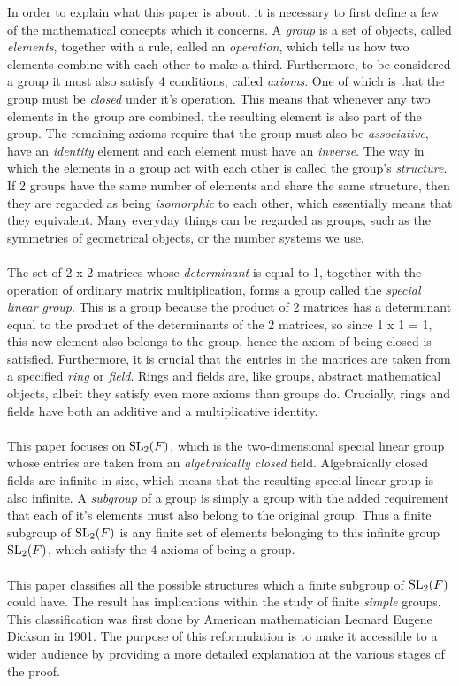 In order to explain what this paper is about, it is necessary to first define a few of the mathematical concepts which it concerns. A \textit{group} is a set of objects, called \textit{elements}, together with a rule, called an \textit{operation}, which tells us how two elements combine with each other to make a third. Furthermore, to be considered a group it must also satisfy 4 conditions, called \textit{axioms}. One of which is that the group must be \textit{closed} under it's operation. This means that whenever any two elements in the group are combined, the resulting element is also part of the group. The remaining axioms require that the group must also be \textit{associative}, have an \textit{identity} element and each element must have an \textit{inverse}. The way in which the elements in a group act with each other is called the group's \textit{structure}. If 2 groups have the same number of elements and share the same structure, then they are regarded as being \textit{isomorphic} to each other, which essentially means that they equivalent. Many everyday things can be regarded as groups, such as the symmetries of geometrical objects, or the number systems we use. \\
\\
The set of 2 x 2 matrices whose \textit{determinant} is equal to 1, together with the operation of ordinary matrix multiplication, 
forms a group called the \textit{special linear group}. This is a group because the product of 2 matrices has a determinant equal to the product of the determinants of the 2 matrices, 
so since 1 x 1 = 1, this new element also belongs to the group, hence the axiom of being closed is satisfied. 
Furthermore, it is crucial that the entries in the matrices are taken from a specified \textit{ring} or \textit{field}. 
Rings and fields are, like groups, abstract mathematical objects, albeit they satisfy even more axioms than groups do. Crucially, rings and fields have both an additive and a multiplicative identity. \\
\\
This paper focuses on $\operatorname{SL}_2(F)$, which is the two-dimensional special linear group whose entries are taken from an \textit{algebraically closed} field. Algebraically closed fields are infinite in size, which means that the resulting special linear group is also infinite. A \textit{subgroup} of a group is simply a group with the added requirement that each of it's elements must also belong to the original group. Thus a finite subgroup of $\operatorname{SL}_2(F)$ is any finite set of elements belonging to this infinite group $\operatorname{SL}_2(F)$, which satisfy the 4 axioms of being a group. \\
\\
This paper classifies all the possible structures which a finite subgroup of $\operatorname{SL}_2(F)$ could have. The result has implications within the study of finite \textit{simple} groups. This classification was first done by American mathematician Leonard Eugene Dickson in 1901. The purpose of this reformulation is to make it accessible to a wider audience by providing a more detailed explanation at the various stages of the proof.


